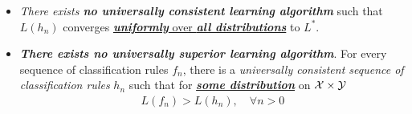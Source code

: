 \documentclass[11pt]{article}
\begin{document}
\begin{itemize}
\begin{remark}
\begin{itemize}
\item \emph{There exists \textbf{no universally consistent learning algorithm}} such that $L(h_n)$ converges \underline{\emph{\textbf{uniformly}} over \emph{\textbf{all distributions}}} to $L^{*}$.

\item \emph{\textbf{There exists no universally superior learning algorithm}}. For every sequence of classification rules $f_n$, there is a \emph{universally consistent
sequence of classification rules} $h_n$ such that for \underline{\emph{\textbf{some distribution}}} on ${\mathcal X} \times {\mathcal Y}$
\begin{align*}
L(f_n) > L(h_n), \quad \forall n >0
\end{align*}
\end{itemize}
\end{remark}
\end{itemize}
\end{document}
